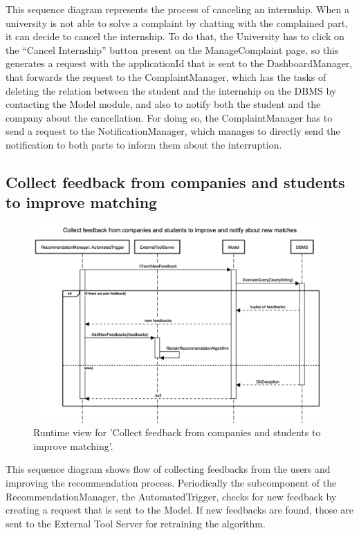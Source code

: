 This sequence diagram represents the process of canceling an internship. When a university is not able to solve a complaint by chatting with the complained part, it can decide to cancel the internship. To do that, the University has to click on the “Cancel Internship” button present on the ManageComplaint page, so this generates a request with the applicationId that is sent to the DashboardManager, that forwards the request to the ComplaintManager, which has the tasks of deleting the relation between the student and the internship on the DBMS by contacting the Model module, and also to notify both the student and the company about the cancellation. For doing so, the ComplaintManager has to send a request to the NotificationManager, which manages to directly send the notification to both parts to inform them about the interruption.



\subsection{Collect feedback from companies and students to improve matching}
\begin{figure}[H]
    \begin{center}
        \includegraphics[width=0.8\linewidth]{DD/LaTeX/Images/RuntimeView/CollectFeedbackToImprove.png}
        \caption{Runtime view for 'Collect feedback from companies and students to improve matching'.}
        \label{fig:runtime_CollectFeedbackToImprove}%
    \end{center}
\end{figure}

This sequence diagram shows flow of collecting feedbacks from the users and improving the recommendation process. Periodically the subcomponent of the RecommendationManager, the AutomatedTrigger, checks for new feedback by creating a request that is sent to the Model. If new feedbacks are found, those are sent to the External Tool Server for retraining the algorithm.


